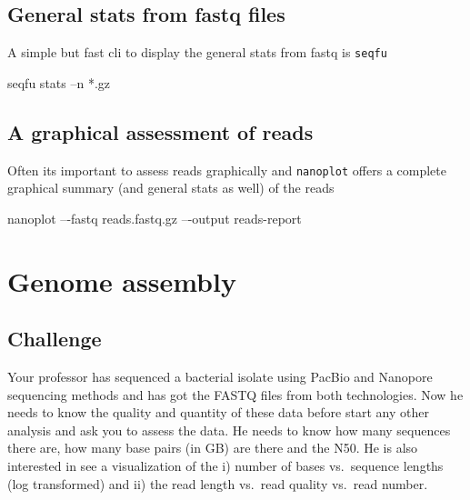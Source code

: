 \documentclass[
  letterpaper,
]{scrbook}
\newenvironment{Shaded}{\begin{snugshade}}{\end{snugshade}}
\newcommand{\ExtensionTok}[1]{\textcolor[rgb]{0.00,0.46,0.62}{#1}}
\newcommand{\NormalTok}[1]{\textcolor[rgb]{0.00,0.46,0.62}{#1}}
\newcommand{\PreprocessorTok}[1]{\textcolor[rgb]{0.68,0.00,0.00}{#1}}
\begin{document}
\hypertarget{general-stats-from-fastq-files}{%
\section*{General stats from fastq
files}\label{general-stats-from-fastq-files}}

A simple but fast cli to display the general stats from fastq is
\texttt{seqfu}

\begin{Shaded}
\begin{Highlighting}[]
\ExtensionTok{seqfu}\NormalTok{ stats –n }\PreprocessorTok{*}\NormalTok{.gz}
\end{Highlighting}
\end{Shaded}

\hypertarget{a-graphical-assessment-of-reads}{%
\section*{A graphical assessment of
reads}\label{a-graphical-assessment-of-reads}}

Often its important to assess reads graphically and \texttt{nanoplot}
offers a complete graphical summary (and general stats as well) of the
reads

\begin{Shaded}
\begin{Highlighting}[]
\ExtensionTok{nanoplot}\NormalTok{ –{-}fastq reads.fastq.gz –{-}output reads{-}report}
\end{Highlighting}
\end{Shaded}

\hypertarget{genome-assembly-1}{%
\chapter{Genome assembly}\label{genome-assembly-1}}

\hypertarget{challenge-5}{%
\section*{Challenge}\label{challenge-5}}

Your professor has sequenced a bacterial isolate using PacBio and
Nanopore sequencing methods and has got the FASTQ files from both
technologies. Now he needs to know the quality and quantity of these
data before start any other analysis and ask you to assess the data. He
needs to know how many sequences there are, how many base pairs (in GB)
are there and the N50. He is also interested in see a visualization of
the i) number of bases vs.~sequence lengths (log transformed) and ii)
the read length vs.~read quality vs.~read number.
\end{document}
